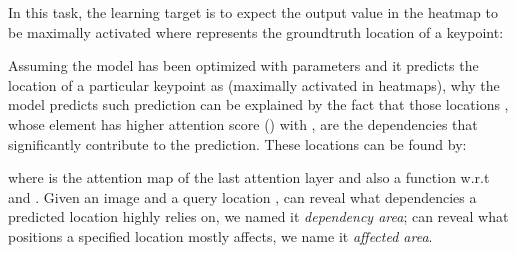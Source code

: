 \documentclass{article}
\begin{document}
In this task, the learning target is to expect the output value  in the heatmap to be maximally activated where  represents the groundtruth location of a keypoint:

Assuming the model has been optimized with parameters  and it predicts the location of a particular keypoint as  (maximally activated in heatmaps), why the model predicts such prediction can be explained by the fact that those locations , whose element  has higher attention score () with , are the dependencies that significantly contribute to the prediction. These locations can be found by:

where  is the attention map of the last attention layer and also a function w.r.t  and . Given an image  and a query location ,  can reveal what dependencies a predicted location  highly relies on, we named it \emph{dependency area};  can reveal what positions a specified location  mostly affects, we name it \emph{affected area}.
\end{document}
